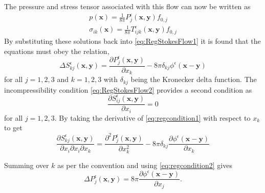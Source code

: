 The pressure and stress tensor associated with this flow can now be written as
\begin{gather}
\label{eq:regpressuresol}
    p(\bm{x}) = \frac{1}{8\pi}P^\epsilon_{j}(\bm{x},\bm{y})f_{0,j}\\
\label{eq:regstresssol}
    \sigma_{ik}(\bm{x}) = \frac{1}{8\pi}T^\epsilon_{ijk}(\bm{x},\bm{y})f_{0,j}
\end{gather}
By substituting these solutions back into \cref{eq:RegStokesFlow1} it is found that the equations must obey the relation,
\begin{equation}
\label{eq:regcondition1}
    \Delta S^\epsilon_{kj}(\bm{x},\bm{y}) = \frac{\partial P^\epsilon_{j}(\bm{x},\bm{y})}{\partial x_k} - 8\pi\delta_{kj}\phi^\epsilon(\bm{x}-\bm{y})
\end{equation}
for all $j=1,2,3$ and $k=1,2,3$ with $\delta_{kj}$ being the Kronecker delta function. The incompressibility condition \cref{eq:RegStokesFlow2} provides a second condition as
\begin{equation}
\label{eq:regcondition2}
    \frac{\partial S^\epsilon_{ij}(\bm{x},\bm{y})}{\partial x_i} = 0
\end{equation}
for all $j=1,2,3$. By taking the derivative of \cref{eq:regcondition1} with respect to $x_k$ to get
\begin{equation*}
    \frac{\partial S^\epsilon_{kj}(\bm{x},\bm{y})}{\partial x_i \partial x_i \partial x_k} = \frac{\partial^2 P^\epsilon_{j}(\bm{x},\bm{y})}{\partial x_k^2} - 8\pi\delta_{kj}\frac{\partial \phi^\epsilon(\bm{x}-\bm{y})}{\partial x_k}
\end{equation*}

Summing over $k$ as per the convention and using \cref{eq:regcondition2} gives
\begin{equation}
\label{eq:regpressureeq}
    \Delta P^\epsilon_{j}(\bm{x},\bm{y}) = 8\pi\frac{\partial \phi^\epsilon(\bm{x}-\bm{y})}{\partial x_j}.
\end{equation}

